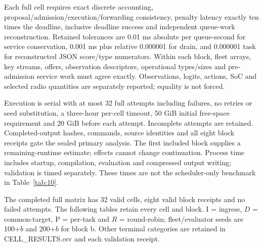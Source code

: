 \documentclass[11pt,a4paper]{article}
\begin{document}
Each full cell requires exact discrete accounting, proposal/admission/execution/forwarding consistency, penalty latency exactly ten times the deadline, inclusive deadline success and independent queue-work reconstruction. Retained tolerances are 0.01 ms absolute per queue-second for service conservation, 0.001 ms plus relative 0.000001 for drain, and 0.000001 task for reconstructed JSON score/type numerators. Within each block, fleet arrays, key streams, offers, observation descriptors, operational types/sizes and pre-admission service work must agree exactly. Observations, logits, actions, SoC and selected radio quantities are separately reported; equality is not forced.

Execution is serial with at most 32 full attempts including failures, no retries or seed substitution, a three-hour per-cell timeout, 50 GiB initial free-space requirement and 20 GiB before each attempt. Incomplete attempts are retained. Completed-output hashes, commands, source identities and all eight block receipts gate the sealed primary analysis. The first included block supplies a remaining-runtime estimate; effects cannot change continuation. Process time includes startup, compilation, evaluation and compressed output writing; validation is timed separately. These times are not the scheduler-only benchmark in Table~\ref{tab:10}.

The completed full matrix has 32 valid cells, eight valid block receipts and no failed attempts. The following tables retain every cell and block. I = ingress, $D$ = common-target, P = per-task and $R$ = round-robin; fleet/evaluator seeds are 100+$b$ and 200+$b$ for block b. Other terminal categories are retained in CELL\_RESULTS.csv and each validation receipt.
\end{document}
